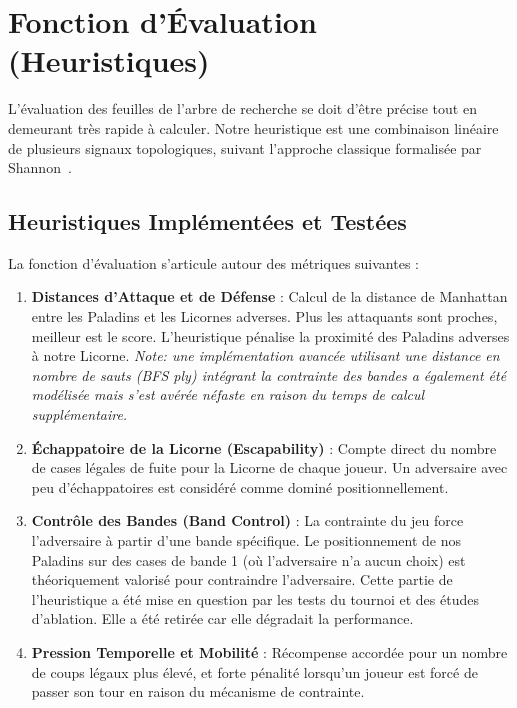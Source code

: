 \documentclass[12pt,a4paper]{article}
\begin{document}
\section{Fonction d'Évaluation (Heuristiques)}
L'évaluation des feuilles de l'arbre de recherche se doit d'être précise tout en demeurant très rapide à calculer. Notre heuristique est une combinaison linéaire de plusieurs signaux topologiques, suivant l'approche classique formalisée par Shannon~\cite{shannon1950}.


\subsection{Heuristiques Implémentées et Testées}
La fonction d'évaluation s'articule autour des métriques suivantes :
\begin{enumerate}
    \item \textbf{Distances d'Attaque et de Défense} : Calcul de la distance de Manhattan entre les Paladins et les Licornes adverses. Plus les attaquants sont proches, meilleur est le score. L'heuristique pénalise la proximité des Paladins adverses à notre Licorne. \textit{Note: une implémentation avancée utilisant une distance en nombre de sauts (BFS ply) intégrant la contrainte des bandes a également été modélisée mais s'est avérée néfaste en raison du temps de calcul supplémentaire.}
    \item \textbf{Échappatoire de la Licorne (Escapability)} : Compte direct du nombre de cases légales de fuite pour la Licorne de chaque joueur. Un adversaire avec peu d'échappatoires est considéré comme dominé positionnellement.
    \item \textbf{Contrôle des Bandes (Band Control)} : La contrainte du jeu force l'adversaire à partir d'une bande spécifique. Le positionnement de nos Paladins sur des cases de bande 1 (où l'adversaire n'a aucun choix) est théoriquement valorisé pour contraindre l'adversaire. Cette partie de l'heuristique a été mise en question par les tests du tournoi et des études d'ablation. Elle a été retirée car elle dégradait la performance.
    \item \textbf{Pression Temporelle et Mobilité} : Récompense accordée pour un nombre de coups légaux plus élevé, et forte pénalité lorsqu'un joueur est forcé de passer son tour en raison du mécanisme de contrainte.
\end{enumerate}
\end{document}
